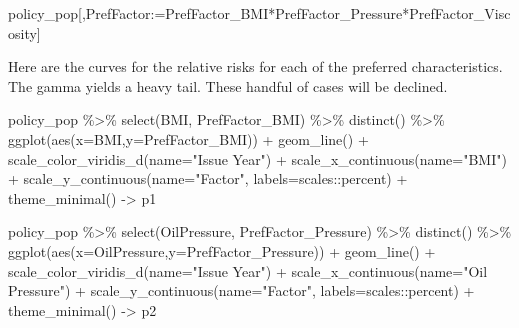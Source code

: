 \documentclass[
  letterpaper,
  DIV=11,
  numbers=noendperiod]{scrartcl}
\newenvironment{Shaded}{\begin{snugshade}}{\end{snugshade}}
\newcommand{\AttributeTok}[1]{\textcolor[rgb]{0.40,0.45,0.13}{#1}}
\newcommand{\ErrorTok}[1]{\textcolor[rgb]{0.68,0.00,0.00}{#1}}
\newcommand{\FunctionTok}[1]{\textcolor[rgb]{0.28,0.35,0.67}{#1}}
\newcommand{\NormalTok}[1]{\textcolor[rgb]{0.00,0.23,0.31}{#1}}
\newcommand{\OtherTok}[1]{\textcolor[rgb]{0.00,0.23,0.31}{#1}}
\newcommand{\SpecialCharTok}[1]{\textcolor[rgb]{0.37,0.37,0.37}{#1}}
\newcommand{\StringTok}[1]{\textcolor[rgb]{0.13,0.47,0.30}{#1}}
\begin{document}
\begin{Shaded}
\begin{Highlighting}[]
\NormalTok{policy\_pop[,PrefFactor}\SpecialCharTok{:}\ErrorTok{=}\NormalTok{PrefFactor\_BMI}\SpecialCharTok{*}\NormalTok{PrefFactor\_Pressure}\SpecialCharTok{*}\NormalTok{PrefFactor\_Viscosity]}
\end{Highlighting}
\end{Shaded}

Here are the curves for the relative risks for each of the preferred
characteristics. The gamma yields a heavy tail. These handful of cases
will be declined.

\begin{Shaded}
\begin{Highlighting}[]
\NormalTok{policy\_pop }\SpecialCharTok{\%\textgreater{}\%}
  \FunctionTok{select}\NormalTok{(BMI, PrefFactor\_BMI) }\SpecialCharTok{\%\textgreater{}\%}
  \FunctionTok{distinct}\NormalTok{() }\SpecialCharTok{\%\textgreater{}\%}
  \FunctionTok{ggplot}\NormalTok{(}\FunctionTok{aes}\NormalTok{(}\AttributeTok{x=}\NormalTok{BMI,}\AttributeTok{y=}\NormalTok{PrefFactor\_BMI)) }\SpecialCharTok{+}
  \FunctionTok{geom\_line}\NormalTok{() }\SpecialCharTok{+}
  \FunctionTok{scale\_color\_viridis\_d}\NormalTok{(}\AttributeTok{name=}\StringTok{"Issue Year"}\NormalTok{) }\SpecialCharTok{+} 
  \FunctionTok{scale\_x\_continuous}\NormalTok{(}\AttributeTok{name=}\StringTok{"BMI"}\NormalTok{) }\SpecialCharTok{+}
  \FunctionTok{scale\_y\_continuous}\NormalTok{(}\AttributeTok{name=}\StringTok{"Factor"}\NormalTok{, }\AttributeTok{labels=}\NormalTok{scales}\SpecialCharTok{::}\NormalTok{percent) }\SpecialCharTok{+}
  \FunctionTok{theme\_minimal}\NormalTok{() }\OtherTok{{-}\textgreater{}}\NormalTok{ p1}

\NormalTok{policy\_pop }\SpecialCharTok{\%\textgreater{}\%}
  \FunctionTok{select}\NormalTok{(OilPressure, PrefFactor\_Pressure) }\SpecialCharTok{\%\textgreater{}\%}
  \FunctionTok{distinct}\NormalTok{() }\SpecialCharTok{\%\textgreater{}\%}
  \FunctionTok{ggplot}\NormalTok{(}\FunctionTok{aes}\NormalTok{(}\AttributeTok{x=}\NormalTok{OilPressure,}\AttributeTok{y=}\NormalTok{PrefFactor\_Pressure)) }\SpecialCharTok{+}
  \FunctionTok{geom\_line}\NormalTok{() }\SpecialCharTok{+}
  \FunctionTok{scale\_color\_viridis\_d}\NormalTok{(}\AttributeTok{name=}\StringTok{"Issue Year"}\NormalTok{) }\SpecialCharTok{+} 
  \FunctionTok{scale\_x\_continuous}\NormalTok{(}\AttributeTok{name=}\StringTok{"Oil Pressure"}\NormalTok{) }\SpecialCharTok{+}
  \FunctionTok{scale\_y\_continuous}\NormalTok{(}\AttributeTok{name=}\StringTok{"Factor"}\NormalTok{, }\AttributeTok{labels=}\NormalTok{scales}\SpecialCharTok{::}\NormalTok{percent) }\SpecialCharTok{+}
  \FunctionTok{theme\_minimal}\NormalTok{() }\OtherTok{{-}\textgreater{}}\NormalTok{ p2}



\end{Highlighting}
\end{Shaded}
\end{document}
